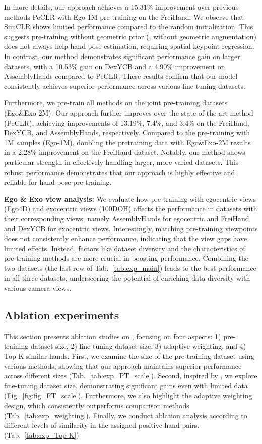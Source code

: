 In more details, our approach achieves a 15.31\% improvement over previous methods PeCLR with Ego-1M pre-training on the FreiHand. We observe that SimCLR shows limited performance compared to the random initialization.
This suggests pre-training without geometric prior (\ie, without geometric augmentation) does not always help hand pose estimation, requiring spatial keypoint regression. In contrast, our method demonstrates significant performance gain on larger datasets, with a 10.53\% gain on DexYCB and a 4.90\% improvement on AssemblyHands compared to PeCLR. These results confirm that our model consistently achieves superior performance across various fine-tuning datasets.

Furthermore, we pre-train all methods on the joint pre-training datasets (Ego\&Exo-2M). Our approach further improves over the state-of-the-art method (PeCLR), achieving improvements of 13.19\%, 7.4\%, and 3.4\% on the FreiHand, DexYCB, and AssemblyHands, respectively. Compared to the pre-training with 1M samples (Ego-1M), doubling the pretraining data with Ego\&Exo-2M results in a 2.28\% improvement on the FreiHand dataset. Notably, our method shows particular strength in effectively handling larger, more varied datasets. This robust performance demonstrates that our approach is highly effective and reliable for hand pose pre-training.



\textbf{Ego \& Exo view analysis:}
We evaluate how pre-training with egocentric views (Ego4D) and exocentric views (100DOH) affects the performance in datasets with their corresponding views, namely AssemblyHands for egocentric and FreiHand and DexYCB for exocentric views. Interestingly, matching pre-training viewpoints does not consistently enhance performance, indicating that the view gaps have limited effects. Instead, factors like dataset diversity and the characteristics of pre-training methods are more crucial in boosting performance. Combining the two datasets (the last row of Tab.~\ref{tab:exp_main}) leads to the best performance in all three datasets, underscoring the potential of enriching data diversity with various camera views.

\subsection{Ablation experiments}\label{sec:exp_abl}

This section presents ablation studies on \Ours, focusing on four aspects: 1) pre-training dataset size, 2) fine-tuning dataset size, 3) adaptive weighting, and 4) Top-K similar hands. First, we examine the size of the pre-training dataset using various methods, showing that our approach maintains superior performance across different sizes (Tab.~\ref{tab:exp_PT_scale}). Second, inspired by \citep{zimmermann:iccv19}, we explore fine-tuning dataset size, demonstrating significant gains even with limited data (Fig.~\ref{fig:fig_FT_scale}). Furthermore, we also highlight the adaptive weighting design, which consistently outperforms comparison methods (Tab.~\ref{tab:exp_weighting}). Finally, we conduct ablation analysis according to different levels of similarity in the assigned positive hand pairs. (Tab.~\ref{tab:exp_Top-K}).

